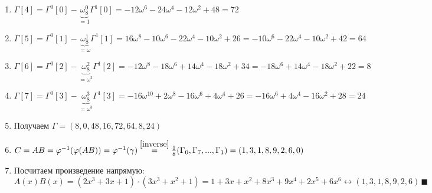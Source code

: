 \documentclass[a4paper]{article}
\begin{document}
\begin{enumerate}
\begin{enumerate}
\item $\Gamma[4]=\Gamma^0[0]-\underbrace{\omega_8^0}_{=1}\Gamma^1[0]=-12\omega^6-24\omega^4-12\omega^2+48=72$
\item $\Gamma[5]=\Gamma^0[1]-\underbrace{\omega_8^1}_{=\omega}\Gamma^1[1]=16\omega^8-10\omega^6-22\omega^4-10\omega^2+26=-10\omega^6-22\omega^4-10\omega^2+42=64$
\item $\Gamma[6]=\Gamma^0[2]-\underbrace{\omega_8^2}_{=\omega^2}\Gamma^1[2]=-12\omega^8-18\omega^6+14\omega^4-18\omega^2+34=-18\omega^6+14\omega^4-18\omega^2+22=8$
\item $\Gamma[7]=\Gamma^0[3]-\underbrace{\omega_8^3}_{=\omega^3}\Gamma^1[3]=-16\omega^{10}+2\omega^8-16\omega^6+4\omega^4+26=-16\omega^6+4\omega^4-16\omega^2+28=24$
\item Получаем $\Gamma=(8,0,48,16,72,64,8,24)$
\item $C=AB=\varphi^{-1}(\varphi(AB))=\varphi^{-1}(\gamma)\overset{\ref{inverse}}{=}\frac{1}{8}(\Gamma_0,\Gamma_7,...,\Gamma_1)=(1,3,1,8,9,2,6,0)$
\item Посчитаем произведение напрямую: $A(x)B(x)=(2 x^3 + 3 x + 1)\cdot(3 x^3 + x^2 + 1)=1 + 3 x + x^2 + 8 x^3 + 9 x^4 + 2 x^5 + 6 x^6\longleftrightarrow(1,3,1,8,9,2,6)\,\blacksquare$
\end{enumerate}
\end{enumerate}
\end{document}
